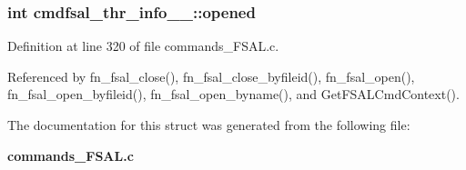 \subsubsection{\setlength{\rightskip}{0pt plus 5cm}int {\bf cmdfsal\_\-thr\_\-info\_\-\_\-::opened}}\label{structcmdfsal__thr__info_____o5}




Definition at line 320 of file commands\_\-FSAL.c.

Referenced by fn\_\-fsal\_\-close(), fn\_\-fsal\_\-close\_\-byfileid(), fn\_\-fsal\_\-open(), fn\_\-fsal\_\-open\_\-byfileid(), fn\_\-fsal\_\-open\_\-byname(), and Get\-FSALCmd\-Context().

The documentation for this struct was generated from the following file:\begin{CompactItemize}
\item 
{\bf commands\_\-FSAL.c}\end{CompactItemize}
